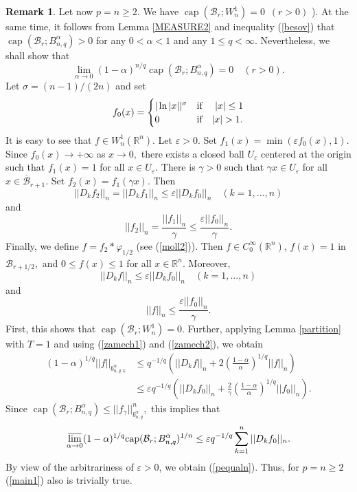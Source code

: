 \documentclass[12pt,twoside,reqno]{amsart}
\numberwithin{equation}{section}
\theoremstyle{definition}
\newtheorem{rem}[teo]{Remark}
\numberwithin{equation}{section}
\begin{document}
\begin{rem}
Let now $p=n\ge 2.$ We have ${\operatorname{cap}} (\mathcal B_r; W_n^1)=0 \,\,\,(r>0)$ \cite[p. 148]{Maz2}).
At the same time, it follows from Lemma \ref{MEASURE2} and
inequality (\ref{besov}) that
 ${\operatorname{cap}}(\mathcal B_r;B_{n,q}^{\alpha})>0$ for any $0<{\alpha}<1$ and any $1\le q<\infty.$
Nevertheless, we shall show that
\begin{equation}\label{pequaln}
\lim_{{\alpha}\to 0} (1-{\alpha})^{n/q}{\operatorname{cap}}(\mathcal B_r; B_{n,q}^{\alpha})=0\quad (r>0).
\end{equation}
Let ${\sigma}=(n-1)/(2n)$ and set
$$
f_0(x)=\begin{cases}
    |\ln |x||^{\sigma} &\textnormal{if }\quad |x|\le 1 \\
    0 &\textnormal{if}\quad |x|>1.
  \end{cases}
$$
It is easy to see that $f\in W_n^1({\mathbb{R}}^n).$ Let ${\varepsilon}>0.$ Set $f_1(x)=\min({\varepsilon} f_0(x),1).$ Since $f_0(x)\to +\infty$ as $x\to 0,$
there exists a closed ball $U_{\varepsilon}$ centered at the origin such that $f_1(x)=1$ for all $x\in U_{\varepsilon}.$ There is ${\gamma }>0$  such that ${\gamma } x\in U_{\varepsilon}$
for all $x\in \overline{\mathcal B}_{r+1}.$
Set $f_2(x)=f_1({\gamma } x).$ Then
$$
||D_k f_2||_n=||D_k f_1||_n\le {\varepsilon} ||D_k f_0||_n \quad (k=1,...,n)
$$
and
$$
||f_2||_n=\frac{||f_1||_n}{\gamma }\le \frac{{\varepsilon} ||f_0||_n}{\gamma }.
$$
Finally, we define $f=f_2\ast {\varphi}_{1/2}$ (see (\ref{moll2})). Then $f\in C_0^\infty({\mathbb{R}}^n)$,
$f(x)=1$ in $\mathcal B_{r+1/2},$ and $0\le f(x)\le 1$ for all $x\in {\mathbb{R}}^n.$ Moreover,
\begin{equation}\label{zamech1}
||D_k f||_n\le {\varepsilon} ||D_k f_0||_n \quad (k=1,...,n)
\end{equation}
and
\begin{equation}\label{zamech2}
||f||_n\le \frac{{\varepsilon} ||f_0||_n}{\gamma }.
\end{equation}
First, this shows that ${\operatorname{cap}}(\mathcal B_r; W_n^1)=0$. Further,  applying Lemma \ref{partition} with $T=1$ and using (\ref{zamech1}) and (\ref{zamech2}), we obtain
$$
\begin{aligned}
(1-{\alpha})^{1/q}||f||_{b_{n,q;k}^{\alpha}} &\le q^{-1/q}\left(||D_k f||_n + 2\left(\frac{1-{\alpha}}{\alpha}\right)^{1/q}||f||_n\right)\\
&\le {\varepsilon} q^{-1/q}\left(||D_k f_0||_n + \frac{2}{\gamma }\left(\frac{1-{\alpha}}{\alpha}\right)^{1/q}||f_0||_n\right).
\end{aligned}
$$
Since ${\operatorname{cap}}\left(\mathcal B_r; B_{n,q}^{\alpha}\right)\le ||f_{\gamma }||_{b_{n,q}^{\alpha}}^n,$ this implies that
$$
\varlimsup_{{\alpha}\to 0}(1-{\alpha})^{1/q}{\operatorname{cap}}(\mathcal B_r; B_{n,q}^{\alpha})^{1/n}\le {\varepsilon} q^{-1/q} \sum_{k=1}^n||D_k f_0||_n.
$$
By view of the arbitrariness of ${\varepsilon}>0$, we obtain (\ref{pequaln}). Thus, for $p=n\ge 2$ (\ref{main1}) also is trivially true.

\end{rem}
\end{document}
